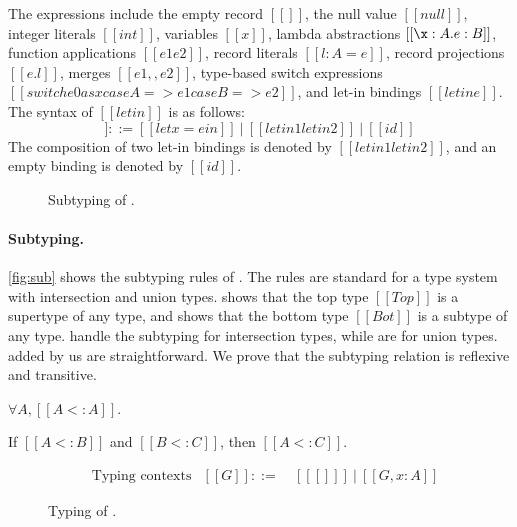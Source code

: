 The expressions include the empty record $[[{}]]$, the null value $[[null]]$,
integer literals $[[int]]$, variables $[[x]]$, lambda abstractions $[[\x:A. e:B]]$,
function applications $[[e1 e2]]$, record literals $[[{l : A = e}]]$, record
projections $[[e.l]]$, merges $[[e1 ,, e2]]$, type-based switch expressions
$[[switch e0 as x case A => e1 case B => e2]]$, and let-in bindings $[[letin e]]$.
The syntax of $[[letin]]$ is as follows:
\begin{equation*}
  [[letin]] ::= [[let x = e in]] ~|~ [[letin1 letin2]] ~|~ [[id]]
\end{equation*}
The composition of two let-in bindings is denoted by $[[letin1 letin2]]$, and an
empty binding is denoted by $[[id]]$.

\begin{figure}
\IUdefnsub{}
\caption{Subtyping of \lambdaiu.} \label{fig:sub}
\end{figure}

\paragraph{Subtyping.}
\autoref{fig:sub} shows the subtyping rules of \lambdaiu. The rules are standard
for a type system with intersection and union types.  shows that
the top type $[[Top]]$ is a supertype of any type, and  shows that
the bottom type $[[Bot]]$ is a subtype of any type.
 handle the subtyping for intersection types,
while  are for union types. 
added by us are straightforward. We prove that the subtyping relation is
reflexive and transitive.

\begin{theorem}
  $\forall A, [[A <: A]]$.
\end{theorem}
\begin{theorem}
  If $[[A <: B]]$ and $[[B <: C]]$, then $[[A <: C]]$.
\end{theorem}

\begin{figure}[t]
\begin{align*}
  &\text{Typing contexts}&[[G]] ::=&~ [[ [] ]] ~|~ [[G, x : A]]
\end{align*}
\IUdefntyping{}
\caption{Typing of \lambdaiu.} \label{fig:typ}
\end{figure}

